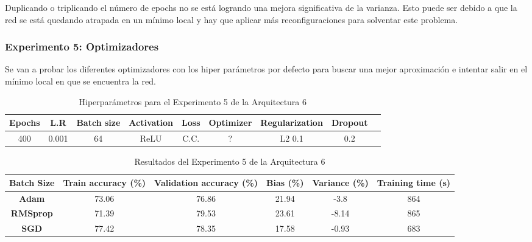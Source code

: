 \documentclass{article}
\begin{document}
Duplicando o triplicando el n\'umero de epochs no se est\'a logrando una mejora significativa de la varianza. Esto puede ser debido a que la red se est\'a quedando atrapada en un m\'inimo local y hay que aplicar más reconfiguraciones para solventar este problema. 
\subsubsection{Experimento 5: Optimizadores}
Se van a probar los diferentes optimizadores con los hiper par\'ametros por defecto para buscar una mejor aproximaci\'on e intentar salir en el m\'inimo local en que se encuentra la red. 

 \begin{table}[!h]
				\begin{tabular}{|c|c|c|c|c|c|c|c|c|}
					\textbf{Epochs}&\textbf{L.R}&\textbf{Batch size}&\textbf{Activation}&\textbf{Loss}&\textbf{Optimizer}&\textbf{Regularization}&\textbf{Dropout}   \\ \hline
					400 & 0.001 & 64 & ReLU & C.C. & ? & L2 0.1 & 0.2 
				\end{tabular}
				\caption{Hiperpar\'ametros para el Experimento 5 de la Arquitectura 6}
				\label{tab:hip-a6-e2}
			\end{table}

    
   
   \begin{table}[!h]
				\begin{center}
					\begin{tabular}{ c | c | c | c | c | c |}
						 \textbf{Batch Size} & \textbf{Train accuracy (\%)} & \textbf{Validation accuracy (\%)} & \textbf{Bias (\%)} & \textbf{Variance (\%)} & \textbf{Training time (s)} \\ \hline
						\textbf{Adam } & 73.06   & 76.86 &  21.94 & -3.8 &864   \\ \hline
                        \textbf{RMSprop } & 71.39   &79.53  & 23.61  & -8.14  &  865   \\ \hline
                        \textbf{SGD} &  77.42   &  78.35& 17.58 & -0.93 &   683  \\ \hline
					\end{tabular}
					\caption{Resultados del Experimento 5 de la Arquitectura 6}
					\label{tab:res-a2-e5}
				\end{center}
			\end{table}
   
\end{document}
